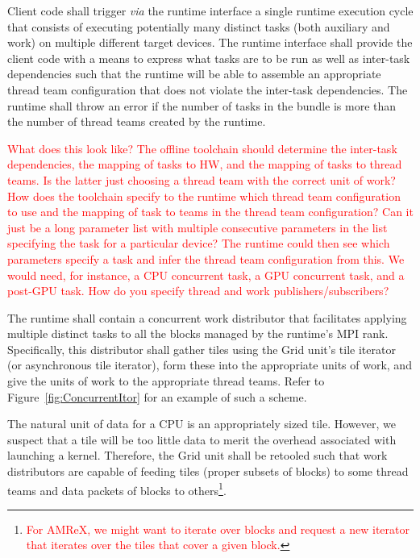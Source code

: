 \documentclass{article}
\begin{document}
\begin{req}
Client code shall trigger \textit{via} the runtime interface a single runtime
execution cycle that consists of executing potentially many distinct tasks (both
auxiliary and work) on multiple different target devices.  The runtime interface
shall provide the client code with a means to express what tasks are to be run
as well as inter-task dependencies such that the runtime will be able to
assemble an appropriate thread team configuration that does not violate the
inter-task dependencies.  The runtime shall throw an error if the number of
tasks in the bundle is more than the number of thread teams created by the
runtime.
\end{req}

\textcolor{red}{What does this look like?  The offline toolchain should
determine the inter-task dependencies, the mapping of tasks to HW, and the
mapping of tasks to thread teams.  Is the latter just choosing a thread team
with the correct unit of work?  How does the toolchain specify to the runtime
which thread team configuration to use and the mapping of task to teams in the
thread team configuration?  Can it just be a long parameter list with multiple
consecutive parameters in the list specifying the task for a particular device?
The runtime could then see which parameters specify a task and infer the thread
team configuration from this.  We would need, for instance, a CPU concurrent
task, a GPU concurrent task, and a post-GPU task.  How do you specify thread and
work publishers/subscribers?}

\begin{req}
The runtime shall contain a concurrent work distributor that facilitates
applying multiple distinct tasks to all the blocks managed by the runtime's MPI
rank.  Specifically, this distributor shall gather tiles using the Grid unit's
tile iterator (or asynchronous tile iterator), form these into the appropriate
units of work, and give the units of work to the appropriate thread teams.
Refer to Figure~\ref{fig:ConcurrentItor} for an example of such a scheme.
\end{req}

\begin{req}
The natural unit of data for a CPU is an appropriately sized tile.  However, we
suspect that a tile will be too little data to merit the overhead associated
with launching a kernel.  Therefore, the Grid unit shall be retooled such that
work distributors are capable of feeding tiles (proper subsets of blocks) to
some thread teams and data packets of blocks to
others\footnote{\textcolor{red}{For AMReX, we might want to iterate over blocks
and request a new iterator that iterates over the tiles that cover a given
block.}}.
\end{req}
\end{document}
